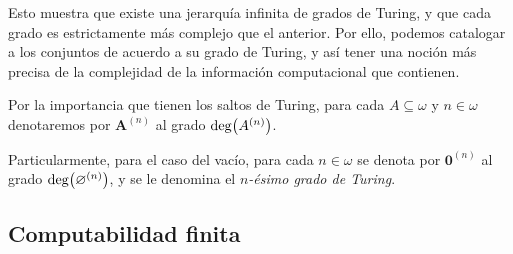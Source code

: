 \begin{agregado}
Esto muestra que existe una jerarquía infinita de grados de Turing, y que cada grado es estrictamente más complejo que el anterior. Por ello, podemos catalogar a los conjuntos de acuerdo a su grado de Turing, y así tener una noción más precisa de la complejidad de la información computacional que contienen.

\begin{notation}
	Por la importancia que tienen los saltos de Turing, para cada $A\subseteq\omega$ y $n\in\omega$ denotaremos por $\mathbf{A}^{(n)}$ al grado $\GRADO{A^{(n)}}$.

	Particularmente, para el caso del vacío, para cada $n\in\omega$ se denota por $\mathbf{0}^{(n)}$ al grado $\GRADO{\varnothing^{(n)}}$, y se le denomina el \emph{$n$-ésimo grado de Turing}.
\end{notation}
\end{agregado}

\begin{agregado}[sección]
\section{Computabilidad finita}
\end{agregado}

